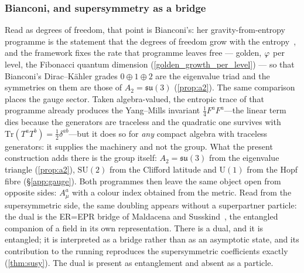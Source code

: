 \subsubsection{Bianconi, and supersymmetry as a bridge}\label{sssec:disc-dof-bianconi}
Read as degrees of freedom, that point is Bianconi's: her gravity-from-entropy programme is the
statement that the degrees of freedom grow with the entropy~\cite{Bianconi}, and the framework fixes
the rate that programme leaves free --- golden, $\varphi$ per level, the Fibonacci quantum dimension
(\ref{golden_growth_per_level}) --- so that Bianconi's Dirac--K\"ahler grades $0\oplus1\oplus2$ are the
eigenvalue triad and the symmetries on them are those of $A_2=\mathfrak{su}(3)$ (\ref{prop:a2}).
The same comparison places the gauge sector. Taken algebra-valued, the entropic trace of that
programme already produces the Yang--Mills invariant $\tfrac14 F^{a}F^{a}$---the linear term dies
because the generators are traceless and the quadratic one survives with
$\mathrm{Tr}(T^aT^b)=\tfrac12\delta^{ab}$---but it does so for \emph{any} compact algebra with
traceless generators: it supplies the machinery and not the group. What the present construction
adds there is the group itself: $A_2=\mathfrak{su}(3)$ from the eigenvalue triangle
(\ref{prop:a2}), $\mathrm{SU}(2)$ from the Clifford latitude and $\mathrm{U}(1)$ from the Hopf
fibre (\S\ref{app:gauge}). Both programmes then leave the same object open from opposite sides:
$A^{a}_\mu$ with a colour index obtained from the metric. Read from the
supersymmetric side, the same doubling appears without a superpartner particle: the dual is the
ER=EPR bridge of Maldacena and Susskind~\cite{MaldacenaSusskind13}, the entangled companion of a
field in its own representation. There is a dual, and it is entangled; it is interpreted as a bridge
rather than as an asymptotic state, and its contribution to the running reproduces the
supersymmetric coefficients exactly (\ref{thm:susy}). The dual is present as entanglement and absent
as a particle.

